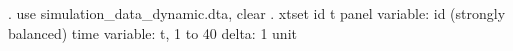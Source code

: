. use simulation_data_dynamic.dta, clear
{\smallskip}
. xtset id t 
       panel variable:  id (strongly balanced)
        time variable:  t, 1 to 40
                delta:  1 unit
{\smallskip}
